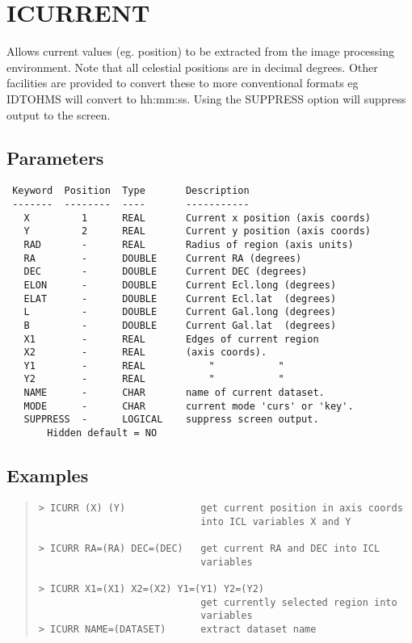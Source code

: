 \documentclass{book}
\renewcommand{\_}{{\tt\char'137}}     %
\begin{document}
\section{ICURRENT}
Allows current values (eg. position) to be extracted from the image
processing environment. Note that all celestial positions are
in decimal degrees. Other facilities are provided to convert these
to more conventional formats eg IDTOHMS will convert to hh:mm:ss.
Using the SUPPRESS option will suppress output to the screen.

\subsection{Parameters}
\begin{verbatim}
 Keyword  Position  Type       Description
 -------  --------  ----       -----------
   X         1      REAL       Current x position (axis coords)
   Y         2      REAL       Current y position (axis coords)
   RAD       -      REAL       Radius of region (axis units)
   RA        -      DOUBLE     Current RA (degrees)
   DEC       -      DOUBLE     Current DEC (degrees)
   ELON      -      DOUBLE     Current Ecl.long (degrees)
   ELAT      -      DOUBLE     Current Ecl.lat  (degrees)
   L         -      DOUBLE     Current Gal.long (degrees)
   B         -      DOUBLE     Current Gal.lat  (degrees)
   X1        -      REAL       Edges of current region
   X2        -      REAL       (axis coords).
   Y1        -      REAL           "           "
   Y2        -      REAL           "           "
   NAME      -      CHAR       name of current dataset.
   MODE      -      CHAR       current mode 'curs' or 'key'.
   SUPPRESS  -      LOGICAL    suppress screen output.
       Hidden default = NO

\end{verbatim}\subsection{Examples}
\begin{quote}\begin{verbatim}
> ICURR (X) (Y)             get current position in axis coords
                            into ICL variables X and Y

> ICURR RA=(RA) DEC=(DEC)   get current RA and DEC into ICL
                            variables

> ICURR X1=(X1) X2=(X2) Y1=(Y1) Y2=(Y2)
                            get currently selected region into
                            variables
> ICURR NAME=(DATASET)      extract dataset name
\end{verbatim}\end{quote}
\end{document}
